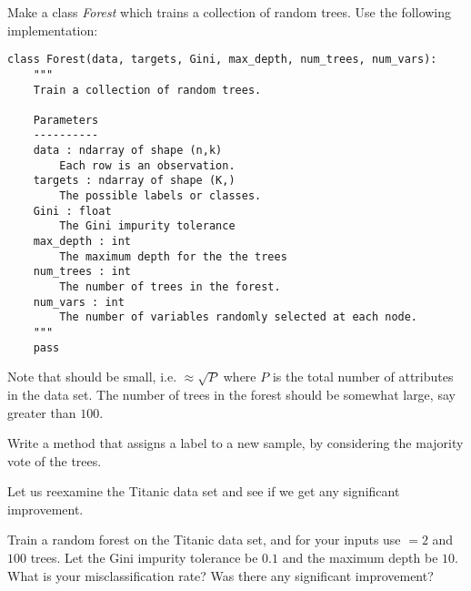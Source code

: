 \begin{problem}
Make a class \emph{Forest} which trains a collection of random trees.  Use the following implementation:

\begin{lstlisting}
class Forest(data, targets, Gini, max_depth, num_trees, num_vars):
    """
    Train a collection of random trees.

    Parameters
    ----------
    data : ndarray of shape (n,k)
        Each row is an observation.
    targets : ndarray of shape (K,)
        The possible labels or classes.
    Gini : float
        The Gini impurity tolerance
    max_depth : int
        The maximum depth for the the trees
    num_trees : int
        The number of trees in the forest.
    num_vars : int
        The number of variables randomly selected at each node.
    """
    pass
\end{lstlisting}

Note that  should be small, i.e.  $ \approx \sqrt{P}$ where $P$ is the total number of attributes in the data set. The number of trees in the forest should be somewhat large, say greater than $100$.
\end{problem}

\begin{problem}
Write a method that assigns a label to a new sample, by considering the majority vote of the trees.
\end{problem}

Let us reexamine the Titanic data set and see if we get any significant improvement.

\begin{problem}
Train a random forest on the Titanic data set, and for your inputs use  $ = 2$ and $100$ trees. Let the Gini impurity tolerance be $0.1$ and the maximum depth be $10$. What is your misclassification rate? Was there any significant improvement?
\end{problem}
